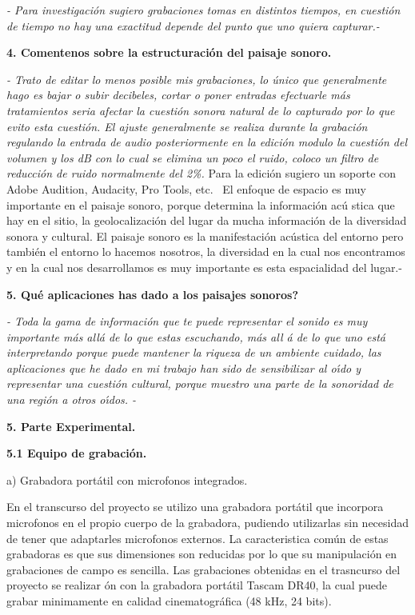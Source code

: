 \qquad \textit{- Para investigaci\'{o}n sugiero grabaciones tomas en
distintos tiempos, en cuesti\'{o}n de tiempo no hay una exactitud depende
del punto que uno quiera capturar.-}

\textbf{4. Comentenos sobre la estructuraci\'{o}n del paisaje sonoro.}

\textit{- Trato de editar lo menos posible mis grabaciones, lo \'{u}nico que
generalmente hago es bajar o subir decibeles, cortar o poner entradas
efectuarle m\'{a}s tratamientos seria afectar la cuesti\'{o}n sonora natural
de lo capturado por lo que evito esta cuesti\'{o}n. El ajuste generalmente
se realiza durante la grabaci\'{o}n regulando la entrada de audio
posteriormente en la edici\'{o}n modulo la cuesti\'{o}n del volumen y los dB
con lo cual se elimina un poco el ruido, coloco un filtro de reducci\'{o}n
de ruido normalmente del 2\%. }Para la edici\'{o}n sugiero un soporte con
Adobe Audition, Audacity, Pro Tools, etc. \ El enfoque de espacio es muy
importante en el paisaje sonoro, porque determina la informaci\'{o}n ac\'{u}%
stica que hay en el sitio, la geolocalizaci\'{o}n del lugar da mucha
informaci\'{o}n de la diversidad sonora y cultural. El paisaje sonoro es la
manifestaci\'{o}n ac\'{u}stica del entorno pero tambi\'{e}n el entorno lo
hacemos nosotros, la diversidad en la cual nos encontramos y en la cual nos
desarrollamos es muy importante es esta espacialidad del lugar.-

\textbf{5. \textquestiondown Qu\'{e} aplicaciones has dado a los paisajes
sonoros?}

\textit{- Toda la gama de informaci\'{o}n que te puede representar el sonido
es muy importante m\'{a}s all\'{a} de lo que estas escuchando, m\'{a}s all%
\'{a} de lo que uno est\'{a} interpretando porque puede mantener la riqueza
de un ambiente cuidado, las aplicaciones que he dado en mi trabajo han sido
de sensibilizar al o\'{\i}do y representar una cuesti\'{o}n cultural, porque
muestro una parte de la sonoridad de una regi\'{o}n a otros o\'{\i}dos. -}

\textbf{5. Parte Experimental.}

\qquad \textbf{5.1 Equipo de grabaci\'{o}n.}

a) Grabadora port\'{a}til con microfonos integrados.

En el transcurso del proyecto se utilizo una grabadora port\'{a}til que
incorpora microfonos en el propio cuerpo de la grabadora, pudiendo
utilizarlas sin necesidad de tener que adaptarles microfonos externos. La
caracteristica com\'{u}n de estas grabadoras es que sus dimensiones son
reducidas por lo que su manipulaci\'{o}n en grabaciones de campo es
sencilla. Las grabaciones obtenidas en el trasncurso del proyecto se realizar%
\'{o}n con la grabadora port\'{a}til Tascam DR40, la cual puede grabar
minimamente en calidad cinematogr\'{a}fica (48 kHz, 24 bits).


